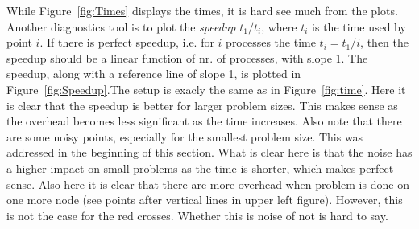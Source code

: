 While Figure~\ref{fig:Times} displays the times, it is hard see much from the plots. Another diagnostics tool is to plot the \textit{speedup} $t_1/t_i$, where $t_i$ is the time used by point $i$. If there is perfect speedup, i.e. for $i$ processes the time $t_i = t_1/i$, then the speedup should be a linear function of nr. of processes, with slope 1. The speedup, along with a reference line of slope 1, is plotted in Figure~\ref{fig:Speedup}.The setup is exacly the same as in Figure~\ref{fig:time}. Here it is clear that the speedup is better for larger problem sizes. This makes sense as the overhead becomes less significant as the time increases. Also note that there are some noisy points, especially for the smallest problem size. This was addressed in the beginning of this section. What is clear here is that the noise has a higher impact on small problems as the time is shorter, which makes perfect sense. Also here it is clear that there are more overhead when problem is done on one more node (see points after vertical lines in upper left figure). However, this is not the case for the red crosses. Whether this is noise of not is hard to say.\\
%
